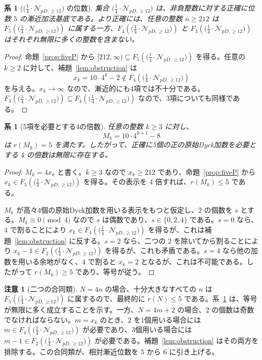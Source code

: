 \documentclass[12pt]{ltjsarticle}
\theoremstyle{plain}
\newtheorem{corollary}[theorem]{系}
\theoremstyle{definition}
\newtheorem{remark}[theorem]{注意}
\theoremstyle{plain}
\newcommand{\Pset}{
  \bigl(\tfrac{1}{4}\cdot\mathcal{N}_{pD,\geq 12}\bigr)
}
\begin{document}
\begin{corollary}[$\Pset$ の位数]\label{cor:orderfive}
集合 $\Pset$ は、非負整数に対する正確に位数 $5$ の漸近加法基底である。より正確には、任意の整数 $n\geq212$ は $F_5(\Pset)$ に属する一方、$F_4(\Pset)$ と $F_3(\Pset)$ はそれぞれ無限に多くの整数を含まない。
\end{corollary}

\begin{proof}
命題~\ref{prop:fiveP} から $[212,\infty)\subseteq F_5(\Pset)$ を得る。任意の $k\geq2$ に対して、補題~\ref{lem:obstruction} は
\[
  x_k=10\cdot4^k-2\notin F_4(\Pset)
\]
を与える。$x_k\to\infty$ なので、漸近的にも4項では不十分である。$F_3(\Pset)\subseteq F_4(\Pset)$ なので、3項についても同様である。
\end{proof}

\begin{corollary}[5項を必要とする4の倍数]
\label{cor:five-multiples}
任意の整数 $k\geq3$ に対し、
\[
  M_k=10\cdot4^{k+1}-8
\]
は $r(M_k)=5$ を満たす。したがって、正確に5個の正の原始Dyck加数を必要とする $4$ の倍数は無限に存在する。
\end{corollary}

\begin{proof}
$M_k=4x_k$ と書く。$k\geq3$ なので $x_k\geq212$ であり、命題~\ref{prop:fiveP} から $x_k\in F_5(\Pset)$ を得る。その表示を $4$ 倍すれば、$r(M_k)\leq5$ である。

$M_k$ が高々4個の原始Dyck加数を用いる表示をもつと仮定し、$2$ の個数を $s$ とする。$M_k\equiv0\pmod4$ なので $s$ は偶数であり、$s\in\{0,2,4\}$ である。$s=0$ なら、$4$ で割ることにより $x_k\in F_4(\Pset)$ を得るが、これは補題~\ref{lem:obstruction} に反する。$s=2$ なら、二つの $2$ を除いてから割ることにより $x_k-1\in F_2(\Pset)$ を得るが、これも矛盾である。$s=4$ なら他の加数を用いる余地がなく、$4$ で割ると $x_k=2$ となるが、これは不可能である。したがって $r(M_k)\geq5$ であり、等号が従う。
\end{proof}

\begin{remark}[二つの合同類]
$N=4n$ の場合、十分大きなすべての $n$ は $F_5(\Pset)$ に属するので、最終的に $r(N)\leq5$ である。系~\ref{cor:five-multiples} は、等号が無限に多く成立することを示す。一方、$N=4m+2$ の場合、$2$ の個数は奇数でなければならない。$m=x_k$ のとき、$2$ を1個用いる場合には $m\in F_4(\Pset)$ が必要であり、3個用いる場合には $m-1\in F_2(\Pset)$ が必要である。補題~\ref{lem:obstruction} はその両方を排除する。この合同類が、相対漸近位数を $5$ から $6$ に引き上げる。
\end{remark}
\end{document}
